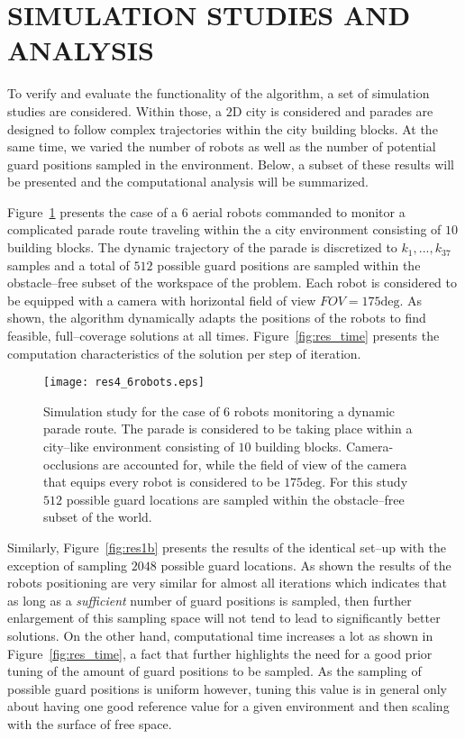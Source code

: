 \documentclass[letterpaper, 10 pt, conference]{ieeeconf}  %
\begin{document}
\section{SIMULATION STUDIES AND ANALYSIS}\label{sec:sim}

To verify and evaluate the functionality of the algorithm, a set of simulation studies are considered. Within those, a $2\textrm{D}$ city is considered and parades are designed to follow complex trajectories within the city building blocks. At the same time, we varied the number of robots as well as the number of potential guard positions sampled in the environment. Below, a subset of these results will be presented and the computational analysis will be summarized. 

Figure~\ref{fig:res1} presents the case of a $6$ aerial robots commanded to monitor a complicated parade route traveling within the a city environment consisting of $10$ building blocks. The dynamic trajectory of the parade is discretized to $k_1,...,k_{37}$ samples and a total of $512$ possible guard positions are sampled within the obstacle--free subset of the workspace of the problem. Each robot is considered to be equipped with a camera with horizontal field of view $FOV=175\textrm{deg}$. As shown, the algorithm dynamically adapts the positions of the robots to find feasible, full--coverage solutions at all times. Figure~\ref{fig:res_time} presents the computation characteristics of the solution per step of iteration.

%
\begin{figure}[htbp]
\centering
  \texttt{[image: res4\_6robots.eps]}
\caption{Simulation study for the case of $6$ robots monitoring a dynamic parade route. The parade is considered to be taking place within a city--like environment consisting of $10$ building blocks. Camera-occlusions are accounted for, while the field of view of the camera that equips every robot is considered to be $175\textrm{deg}$. For this study $512$ possible guard locations are sampled within the obstacle--free subset of the world.}
\label{fig:res1}
\end{figure}
%

Similarly, Figure~\ref{fig:res1b} presents the results of the identical set--up with the exception of sampling $2048$ possible guard locations. As shown the results of the robots positioning are very similar for almost all iterations which indicates that as long as a \emph{sufficient} number of guard positions is sampled, then further enlargement of this sampling space will not tend to lead to significantly better solutions. On the other hand, computational time increases a lot as shown in Figure~\ref{fig:res_time}, a fact that further highlights the need for a good prior tuning of the amount of guard positions to be sampled. As the sampling of possible guard positions is uniform however, tuning this value is in general only about having one good reference value for a given environment and then scaling with the surface of free space. 
\end{document}
